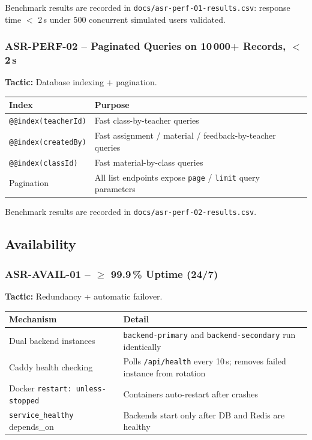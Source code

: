 \documentclass[12pt,a4paper]{article}
\begin{document}
Benchmark results are recorded in \texttt{docs/asr-perf-01-results.csv}: response time $<$ 2\,s under 500 concurrent simulated users validated.

\subsubsection{ASR-PERF-02 -- Paginated Queries on 10\,000+ Records, $<$ 2\,s}

\textbf{Tactic:} Database indexing + pagination.

\begin{tabularx}{\textwidth}{L{4cm} L{9.5cm}}
  \toprule
  \textbf{Index} & \textbf{Purpose} \\
  \midrule
  \texttt{@@index(teacherId)} & Fast class-by-teacher queries \\
  \texttt{@@index(createdBy)} & Fast assignment / material / feedback-by-teacher queries \\
  \texttt{@@index(classId)} & Fast material-by-class queries \\
  Pagination & All list endpoints expose \texttt{page} / \texttt{limit} query parameters \\
  \bottomrule
\end{tabularx}

Benchmark results are recorded in \texttt{docs/asr-perf-02-results.csv}.

\subsection{Availability}

\subsubsection{ASR-AVAIL-01 -- $\geq$ 99.9\,\% Uptime (24/7)}

\textbf{Tactic:} Redundancy + automatic failover.

\begin{tabularx}{\textwidth}{L{4.5cm} L{9cm}}
  \toprule
  \textbf{Mechanism} & \textbf{Detail} \\
  \midrule
  Dual backend instances & \texttt{backend-primary} and \texttt{backend-secondary} run identically \\
  Caddy health checking & Polls \texttt{/api/health} every 10\,s; removes failed instance from rotation \\
  Docker \texttt{restart: unless-stopped} & Containers auto-restart after crashes \\
  \texttt{service\_healthy} depends\_on & Backends start only after DB and Redis are healthy \\
  \bottomrule
\end{tabularx}
\end{document}
